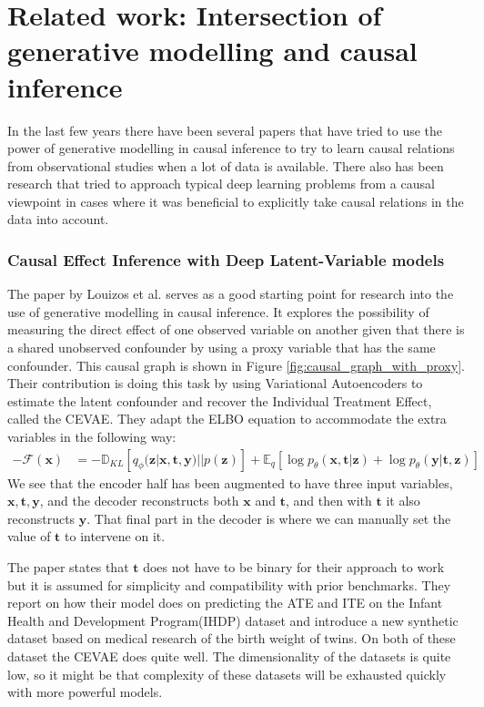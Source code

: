 \documentclass{article}
\newcommand{\bt}{\mathbf{t}}
\newcommand{\bx}{\mathbf{x}}
\newcommand{\by}{\mathbf{y}}
\newcommand{\bz}{\mathbf{z}}
\begin{document}
\section{Related work: Intersection of generative modelling and causal inference}
In the last few years there have been several papers that have tried to use the power of generative modelling in causal inference to try to learn causal relations from observational studies when a lot of data is available. There also has been research that tried to approach typical deep learning problems from a causal viewpoint in cases where it was beneficial to explicitly take causal relations in the data into account.

\subsubsection*{Causal Effect Inference with Deep Latent-Variable models}
The paper by Louizos et al.\cite{louizos2017causal} serves as a good starting point for research into the use of generative modelling in causal inference. It explores the possibility of measuring the direct effect of one observed variable on another given that there is a shared unobserved confounder by using a proxy variable that has the same confounder. This causal graph is shown in Figure \ref{fig:causal_graph_with_proxy}. Their contribution is doing this task by using Variational Autoencoders\cite{kingma2013auto} to estimate the latent confounder and recover the Individual Treatment Effect, called the CEVAE. They adapt the ELBO equation to accommodate the extra variables in the following way:
\begin{equation}\label{equation:CEVAE_ELBO}
    \begin{split}
-\mathcal{F}(\bx) &= -\mathbb{D}_{KL}[q_\phi(\bz|\bx, \bt, \by) || p(\bz)] + \mathbb{E}_q[\log p_\theta(\bx, \bt|\bz) + \log p_\theta(\by|\bt, \bz)]
    \end{split}    
\end{equation}
We see that the encoder half has been augmented to have three input variables, $\bx, \bt, \by$, and the decoder reconstructs both $\bx$ and $\bt$, and then with $\bt$ it also reconstructs $\by$. That final part in the decoder is where we can manually set the value of $\bt$ to intervene on it.

The paper states that $\bt$ does not have to be binary for their approach to work but it is assumed for simplicity and compatibility with prior benchmarks. They report on how their model does on predicting the ATE and ITE on the Infant Health and Development Program(IHDP) dataset\cite{hill2011bayesian} and introduce a new synthetic dataset based on medical research of the birth weight of twins\cite{almond2005costs}. On both of these dataset the CEVAE does quite well. The dimensionality of the datasets is quite low, so it might be that complexity of these datasets will be exhausted quickly with more powerful models.
\end{document}
